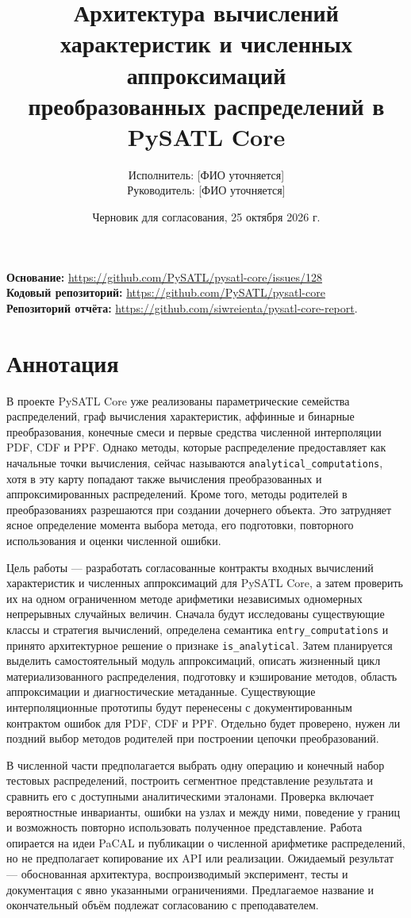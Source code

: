 \documentclass[12pt,a4paper]{article}
\title{Архитектура вычислений характеристик и численных аппроксимаций\\ преобразованных распределений в PySATL Core}
\author{Исполнитель: [ФИО уточняется]\\ Руководитель: [ФИО уточняется]}
\date{Черновик для согласования, 25 октября 2026 г.}
\begin{document}
\maketitle
\begin{center}
\textbf{Основание:} \url{https://github.com/PySATL/pysatl-core/issues/128}\\
\textbf{Кодовый репозиторий:} \url{https://github.com/PySATL/pysatl-core}\\
\textbf{Репозиторий отчёта:} \url{https://github.com/siwreienta/pysatl-core-report}.
\end{center}

\section*{Аннотация}
В проекте PySATL Core уже реализованы параметрические семейства распределений, граф вычисления характеристик, аффинные и бинарные преобразования, конечные смеси и первые средства численной интерполяции PDF, CDF и PPF. Однако методы, которые распределение предоставляет как начальные точки вычисления, сейчас называются \texttt{analytical\_computations}, хотя в эту карту попадают также вычисления преобразованных и аппроксимированных распределений. Кроме того, методы родителей в преобразованиях разрешаются при создании дочернего объекта. Это затрудняет ясное определение момента выбора метода, его подготовки, повторного использования и оценки численной ошибки.

Цель работы — разработать согласованные контракты входных вычислений характеристик и численных аппроксимаций для PySATL Core, а затем проверить их на одном ограниченном методе арифметики независимых одномерных непрерывных случайных величин. Сначала будут исследованы существующие классы и стратегия вычислений, определена семантика \texttt{entry\_computations} и принято архитектурное решение о признаке \texttt{is\_analytical}. Затем планируется выделить самостоятельный модуль аппроксимаций, описать жизненный цикл материализованного распределения, подготовку и кэширование методов, область аппроксимации и диагностические метаданные. Существующие интерполяционные прототипы будут перенесены с документированным контрактом ошибок для PDF, CDF и PPF. Отдельно будет проверено, нужен ли поздний выбор методов родителей при построении цепочки преобразований.

В численной части предполагается выбрать одну операцию и конечный набор тестовых распределений, построить сегментное представление результата и сравнить его с доступными аналитическими эталонами. Проверка включает вероятностные инварианты, ошибки на узлах и между ними, поведение у границ и возможность повторно использовать полученное представление. Работа опирается на идеи PaCAL и публикации о численной арифметике распределений, но не предполагает копирование их API или реализации. Ожидаемый результат — обоснованная архитектура, воспроизводимый эксперимент, тесты и документация с явно указанными ограничениями. Предлагаемое название и окончательный объём подлежат согласованию с преподавателем.
\end{document}

